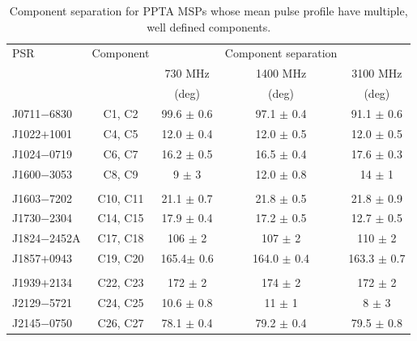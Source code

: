 \documentclass[useAMS,usenatbib]{mn2e}
\begin{document}
\begin{table}
\begin{center}
\caption{Component separation for PPTA MSPs whose mean pulse profile have multiple, well defined components.}
\label{separation}
\begin{tabular}{lcccc}
\hline
PSR              & Component        &         & Component separation &      \\
								 &                  & 730 MHz & 1400 MHz             & 3100 MHz \\
								 &                  &  (deg)  & (deg)                &   (deg)  \\
\hline
J0711$-$6830     &  C1, C2          &99.6  $\pm$ 0.6  & 97.1  $\pm$ 0.4 & 91.1 $\pm$ 0.6  \\
J1022$+$1001     &  C4, C5          &12.0  $\pm$ 0.4  & 12.0  $\pm$ 0.5 & 12.0 $\pm$ 0.5  \\
J1024$-$0719     &  C6, C7          &16.2  $\pm$ 0.5  & 16.5  $\pm$ 0.4 & 17.6 $\pm$ 0.3  \\
J1600$-$3053     &  C8, C9          & 9    $\pm$ 3    & 12.0  $\pm$ 0.8 &  14  $\pm$ 1    \\
	               &                  &                 &                 &                 \\
J1603$-$7202     &  C10, C11        &21.1  $\pm$ 0.7  & 21.8  $\pm$ 0.5 & 21.8 $\pm$ 0.9  \\
J1730$-$2304     &  C14, C15        &17.9  $\pm$ 0.4  & 17.2  $\pm$ 0.5 & 12.7 $\pm$ 0.5  \\
J1824$-$2452A    &  C17, C18        &  106 $\pm$ 2    &  107  $\pm$ 2   & 110  $\pm$ 2    \\
J1857$+$0943     &  C19, C20        & 165.4$\pm$ 0.6  & 164.0 $\pm$ 0.4 &163.3 $\pm$ 0.7  \\
	               &                  &                 &                 &                 \\
J1939$+$2134     &  C22, C23        & 172  $\pm$ 2    & 174   $\pm$ 2   &  172 $\pm$ 2    \\
J2129$-$5721     &  C24, C25        & 10.6 $\pm$ 0.8  &   11  $\pm$ 1   &   8  $\pm$ 3    \\
J2145$-$0750     &  C26, C27        & 78.1 $\pm$ 0.4  & 79.2  $\pm$ 0.4 &79.5  $\pm$ 0.8  \\ 
\hline
\end{tabular}
\end{center}
\end{table}
\end{document}
